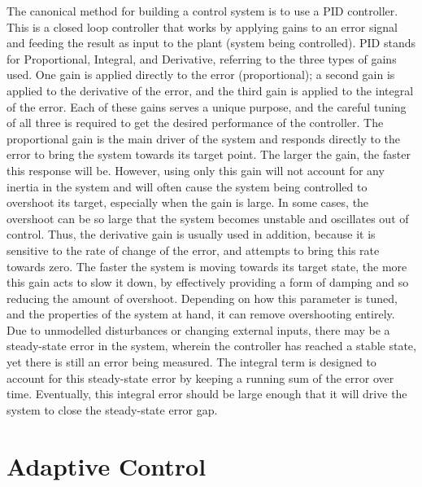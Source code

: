 \documentclass[letterpaper,12pt,titlepage,oneside,final]{book}
\begin{document}

The canonical method for building a control system is to use a PID controller. 
This is a closed loop controller that works by applying gains to an error signal and feeding the result as input to the plant (system being controlled). 
PID stands for Proportional, Integral, and Derivative, referring to the three types of gains used. 
One gain is applied directly to the error (proportional); a second gain is applied to the derivative of the error, and the third gain is applied to the integral of the error. 
Each of these gains serves a unique purpose, and the careful tuning of all three is required to get the desired performance of the controller. 
The proportional gain is the main driver of the system and responds directly to the error to bring the system towards its target point. 
The larger the gain, the faster this response will be.
However, using only this gain will not account for any inertia in the system and will often cause the system being controlled to overshoot its target, especially when the gain is large. 
In some cases, the overshoot can be so large that the system becomes unstable and oscillates out of control.
Thus, the derivative gain is usually used in addition, because it is sensitive to the rate of change of the error, and attempts to bring this rate towards zero. 
The faster the system is moving towards its target state, the more this gain acts to slow it down, by effectively providing a form of damping and so reducing the amount of overshoot.
Depending on how this parameter is tuned, and the properties of the system at hand, it can remove overshooting entirely. 
Due to unmodelled disturbances or changing external inputs, there may be a steady-state error in the system, wherein the controller has reached a stable state, yet there is still an error being measured. 
The integral term is designed to account for this steady-state error by keeping a running sum of the error over time. 
Eventually, this integral error should be large enough that it will drive the system to close the steady-state error gap.

\section{Adaptive Control} \label{sec:adaptive_control}
\end{document}
